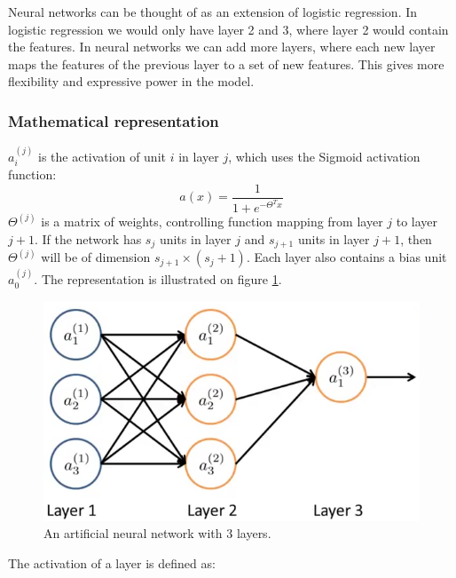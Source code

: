 Neural networks can be thought of as an extension of logistic regression.
In logistic regression we would only have layer 2 and 3, where layer 2 would contain the features.
In neural networks we can add more layers, where each new layer maps the features of the previous layer to a set of new features.
This gives more flexibility and expressive power in the model.

\subsubsection{Mathematical representation}

$a_i^{(j)}$ is the activation of unit $i$ in layer $j$, which uses the Sigmoid activation function: 
\begin{equation}
a(x) = \dfrac{1}{1+e^{-{\Theta}^Tx}}
\end{equation}
$\Theta^{(j)}$ is a matrix of weights, controlling function mapping from layer $j$ to layer $j+1$.
If the network has $s_j$ units in layer $j$ and $s_{j+1}$ units in layer $j+1$, then $\Theta^{(j)}$ will be of dimension $s_{j+1}\times(s_j+1)$.
Each layer also contains a bias unit $a_0^{(j)}$.
The representation is illustrated on figure \ref{fig:neural-network-detailed}.


\begin{figure}[H]
\centering
\includegraphics[scale=.5]{billeder/neural-network-detailed}
\caption{An artificial neural network with 3 layers.}
\label{fig:neural-network-detailed}
\end{figure}

The activation of a layer is defined as:

